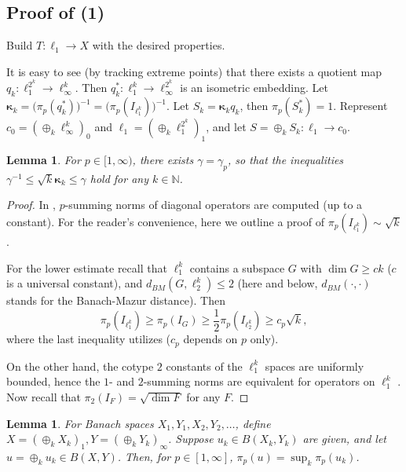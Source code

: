 \documentclass{amsart}
\theoremstyle{plain}
\newtheorem{lemma}[theorem]{Lemma}
\theoremstyle{definition}
\numberwithin{equation}{section}
\newcommand{\N}{\mathbb{N}}
\begin{document}
\subsection{Proof of (1)}
Build $T : \ell_1 \to X$ with the desired properties.

 It is easy to see (by tracking extreme points) that there exists a quotient map $q_k : \ell_1^{2^k} \to \ell_\infty^k$. Then $q_k^* : \ell_1^k \to \ell_\infty^{2^k}$ is an isometric embedding.
 Let ${\boldsymbol{\kappa}}_k = \big( \pi_p (q_k^*)\big)^{-1} = \big( \pi_p (I_{\ell_1^k})\big)^{-1}$. Let $S_k = {\boldsymbol{\kappa}}_k q_k$, then $\pi_p(S_k^*) = 1$.
 Represent $c_0 = (\oplus_k \ell_\infty^k)_0$ and $\ell_1 = (\oplus_k \ell_1^{2^k})_1$, and let $S = \oplus_k S_k : \ell_1 \to c_0$.

 \begin{lemma}\label{kappa-k}
 For $p \in [1,\infty)$, there exists $\gamma = \gamma_p$, so that the inequalities $\gamma^{-1} \leq \sqrt{k} {\boldsymbol{\kappa}}_k \leq \gamma$ hold for any $k \in \N$.
 \end{lemma}

\begin{proof}
In \cite{Gar}, $p$-summing norms of diagonal operators are computed (up to a constant). For the reader's convenience, here we outline a proof of $\pi_p (I_{\ell_1^k}) \sim \sqrt{k}$.

For the lower estimate recall that $\ell_1^k$ contains a subspace $G$ with $\dim G \geq ck$ ($c$ is a universal constant), and $d_{BM}(G, \ell_2^k) \leq 2$ (here and below, $d_{BM}(\cdot , \cdot )$ stands for the Banach-Mazur distance). Then
$$
\pi_p (I_{\ell_1^k}) \geq \pi_p(I_G) \geq \frac12 \pi_p(I_{\ell_2^k}) \geq c_p \sqrt{k} ,
$$
where the last inequality utilizes \cite[Corollary 4.13]{DJT} ($c_p$ depends on $p$ only).

On the other hand, the cotype $2$ constants of the $\ell_1^k$ spaces are uniformly bounded, hence the $1$- and $2$-summing norms are equivalent for operators on $\ell_1^k$ \cite[Corollary 11.16]{DJT}. Now recall that $\pi_2(I_F) = \sqrt{\dim F}$ for any $F$.
\end{proof}
 
 \begin{lemma}\label{p-summing norm}
For Banach spaces $X_1, Y_1, X_2, Y_2, \ldots$, define $X = (\oplus_k X_k)_1, Y = (\oplus_k Y_k)_\infty$. 
Suppose $u_k \in B(X_k,Y_k)$ are given, and let $u = \oplus_k u_k \in B(X,Y)$. Then, for $p \in [1,\infty]$, $\pi_p(u) = \sup_k \pi_p(u_k)$.
 \end{lemma}
\end{document}
